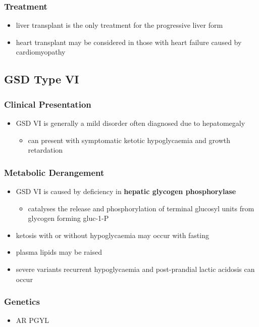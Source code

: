 \documentclass[12pt]{scrartcl}
\begin{document}
\subsubsection{Treatment}
\label{sec:org968542a}
\begin{itemize}
\item liver transplant is the only treatment for the progressive liver form
\item heart transplant may be considered in those with heart failure caused by cardiomyopathy
\end{itemize}
\subsection{GSD Type VI}
\label{sec:org7f323b2}
\subsubsection{Clinical Presentation}
\label{sec:orge421601}
\begin{itemize}
\item GSD VI is generally a mild disorder often diagnosed due to hepatomegaly
\begin{itemize}
\item can present with symptomatic ketotic hypoglycaemia and growth retardation
\end{itemize}
\end{itemize}
\subsubsection{Metabolic Derangement}
\label{sec:org1dd61f6}
\begin{itemize}
\item GSD VI is caused by deficiency in \textbf{hepatic glycogen phosphorylase}
\begin{itemize}
\item catalyses the release and phosphorylation of terminal glucosyl units
from glycogen forming gluc-1-P
\end{itemize}
\item ketosis with or without hypoglycaemia may occur with fasting
\item plasma lipids may be raised
\item severe variants recurrent hypoglycaemia and post-prandial lactic
acidosis can occur
\end{itemize}
\subsubsection{Genetics}
\label{sec:org53c87ed}
\begin{itemize}
\item AR PGYL
\end{itemize}
\end{document}

